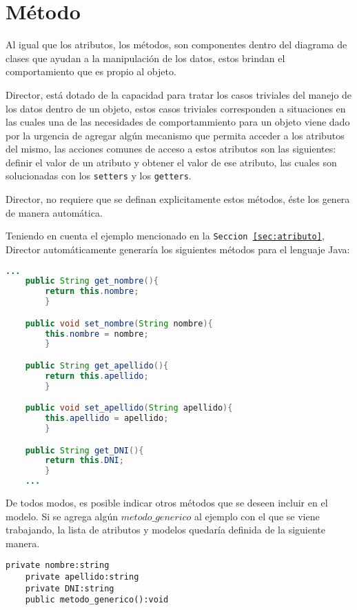 \section{Método}
\label{sec:metodo}
Al igual que los atributos, los métodos, son componentes dentro del diagrama de
clases que ayudan a la manipulación de los datos, estos brindan el
comportamiento que es propio al objeto.

Director, está dotado de la capacidad para tratar los casos triviales del
manejo de los datos dentro de un objeto, estos casos triviales corresponden a
situaciones en las cuales una de las necesidades de comportammiento para un
objeto viene dado por la urgencia de agregar algún mecanismo que permita
acceder a los atributos del mismo, las acciones comunes de acceso a estos
atributos son las siguientes: definir el valor de un atributo y obtener el
valor de ese atributo, las cuales son solucionadas con los \texttt{setters}
y los \texttt{getters}.

Director, no requiere que se definan explicitamente estos métodos, éste los
genera de manera automática.

Teniendo en cuenta el ejemplo mencionado en la \texttt{Seccion
\ref{sec:atributo}}, Director automáticamente generaría los siguientes métodos
para el lenguaje Java:

\begin{lstlisting}[language=Java, basicstyle=\footnotesize\ttfamily,
label=lst:drt_java_metodo, caption={Java - Generación \texttt{Fragmento \ref{sec:atributo}}}]
  ...
	public String get_nombre(){
		return this.nombre;
		}

	public void set_nombre(String nombre){
		this.nombre = nombre;
		}

	public String get_apellido(){
		return this.apellido;
		}

	public void set_apellido(String apellido){
		this.apellido = apellido;
		}

	public String get_DNI(){
		return this.DNI;
		}
	...
\end{lstlisting}

De todos modos, es posible indicar otros métodos que se deseen incluir en el
modelo. Si se agrega algún $metodo\_generico$ al ejemplo con el que se viene
trabajando, la lista de atributos y modelos quedaría definida de la siguiente
manera.

\begin{lstlisting}[caption={Director - Declaración de Método}, label=lst:drt_java_modelo_metodo_generico]
	private nombre:string
	private apellido:string
	private DNI:string
	public metodo_generico():void
\end{lstlisting}


